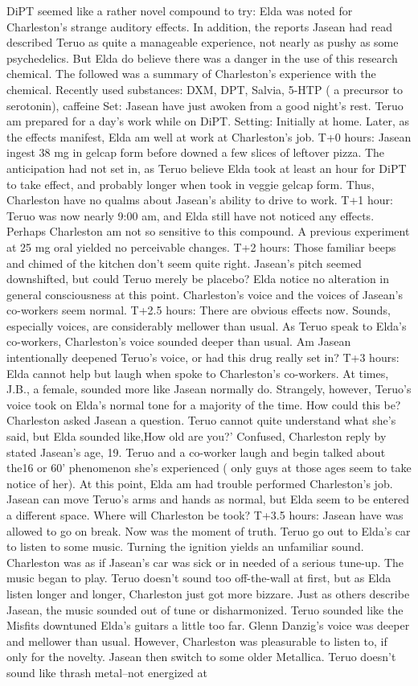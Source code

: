 \documentclass[12pt]{book}
\begin{document}
DiPT seemed like a rather novel compound to try: Elda was noted for Charleston's strange auditory effects. In addition, the reports Jasean had read described Teruo as quite a manageable experience, not nearly as pushy as some psychedelics. But Elda do believe there was a danger in the use of this research chemical. The followed was a summary of Charleston's experience with the chemical. Recently used substances: DXM, DPT, Salvia, 5-HTP ( a precursor to serotonin), caffeine Set: Jasean have just awoken from a good night's rest. Teruo am prepared for a day's work while on DiPT. Setting: Initially at home. Later, as the effects manifest, Elda am well at work at Charleston's job. T+0 hours: Jasean ingest 38 mg in gelcap form before downed a few slices of leftover pizza. The anticipation had not set in, as Teruo believe Elda took at least an hour for DiPT to take effect, and probably longer when took in veggie gelcap form. Thus, Charleston have no qualms about Jasean's ability to drive to work. T+1 hour: Teruo was now nearly 9:00 am, and Elda still have not noticed any effects. Perhaps Charleston am not so sensitive to this compound. A previous experiment at 25 mg oral yielded no perceivable changes. T+2 hours: Those familiar beeps and chimed of the kitchen don't seem quite right. Jasean's pitch seemed downshifted, but could Teruo merely be placebo? Elda notice no alteration in general consciousness at this point. Charleston's voice and the voices of Jasean's co-workers seem normal. T+2.5 hours: There are obvious effects now. Sounds, especially voices, are considerably mellower than usual. As Teruo speak to Elda's co-workers, Charleston's voice sounded deeper than usual. Am Jasean intentionally deepened Teruo's voice, or had this drug really set in? T+3 hours: Elda cannot help but laugh when spoke to Charleston's co-workers. At times, J.B., a female, sounded more like Jasean normally do. Strangely, however, Teruo's voice took on Elda's normal tone for a majority of the time. How could this be? Charleston asked Jasean a question. Teruo cannot quite understand what she's said, but Elda sounded like,How old are you?' Confused, Charleston reply by stated Jasean's age, 19. Teruo and a co-worker laugh and begin talked about the16 or 60' phenomenon she's experienced ( only guys at those ages seem to take notice of her). At this point, Elda am had trouble performed Charleston's job. Jasean can move Teruo's arms and hands as normal, but Elda seem to be entered a different space. Where will Charleston be took? T+3.5 hours: Jasean have was allowed to go on break. Now was the moment of truth. Teruo go out to Elda's car to listen to some music. Turning the ignition yields an unfamiliar sound. Charleston was as if Jasean's car was sick or in needed of a serious tune-up. The music began to play. Teruo doesn't sound too off-the-wall at first, but as Elda listen longer and longer, Charleston just got more bizzare. Just as others describe Jasean, the music sounded out of tune or disharmonized. Teruo sounded like the Misfits downtuned Elda's guitars a little too far. Glenn Danzig's voice was deeper and mellower than usual. However, Charleston was pleasurable to listen to, if only for the novelty. Jasean then switch to some older Metallica. Teruo doesn't sound like thrash metal--not energized at 
\end{document}
